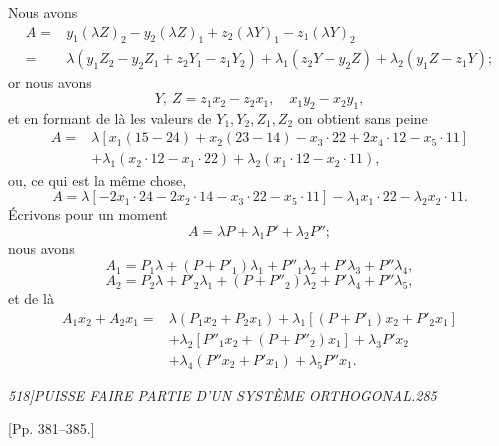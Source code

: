 \documentclass[11pt]{article}
\newcommand{\phead}[3]{\noindent\textit{#1\hfill #2\hfill #3}\par\medskip}
\begin{document}
Nous avons
\[
\begin{split}
A={}&y_1(\lambda Z)_2-y_2(\lambda Z)_1+z_2(\lambda Y)_1-z_1(\lambda Y)_2\\
={}&\lambda(y_1Z_2-y_2Z_1+z_2Y_1-z_1Y_2)
+\lambda_1(z_2Y-y_2Z)+\lambda_2(y_1Z-z_1Y);
\end{split}
\]
or nous avons
\[
Y,\ Z=z_1x_2-z_2x_1,\quad x_1y_2-x_2y_1,
\]
et en formant de l\`a les valeurs de $Y_1,Y_2,Z_1,Z_2$ on obtient sans peine
\[
\begin{split}
A={}&\lambda[x_1(15-24)+x_2(23-14)-x_3\cdot22+2x_4\cdot12-x_5\cdot11]\\
&+\lambda_1(x_2\cdot12-x_1\cdot22)+\lambda_2(x_1\cdot12-x_2\cdot11),
\end{split}
\]
ou, ce qui est la m\^eme chose,
\[
A=\lambda[-2x_1\cdot24-2x_2\cdot14-x_3\cdot22-x_5\cdot11]
-\lambda_1x_1\cdot22-\lambda_2x_2\cdot11.
\]
\'Ecrivons pour un moment
\[
A=\lambda P+\lambda_1P'+\lambda_2P'';
\]
nous avons
\[
A_1=P_1\lambda+(P+P'_1)\lambda_1+P''_1\lambda_2+P'\lambda_3+P''\lambda_4,
\]
\[
A_2=P_2\lambda+P'_2\lambda_1+(P+P''_2)\lambda_2+P'\lambda_4+P''\lambda_5,
\]
et de l\`a
\[
\begin{split}
A_1x_2+A_2x_1={}&\lambda(P_1x_2+P_2x_1)+\lambda_1[(P+P'_1)x_2+P'_2x_1]\\
&+\lambda_2[P''_1x_2+(P+P''_2)x_1]+\lambda_3P'x_2\\
&+\lambda_4(P''x_2+P'x_1)+\lambda_5P''x_1.
\end{split}
\]

\clearpage

\phead{518]}{PUISSE FAIRE PARTIE D'UN SYST\`EME ORTHOGONAL.}{285}

\begin{center}[Pp. 381--385.]\end{center}
\end{document}
